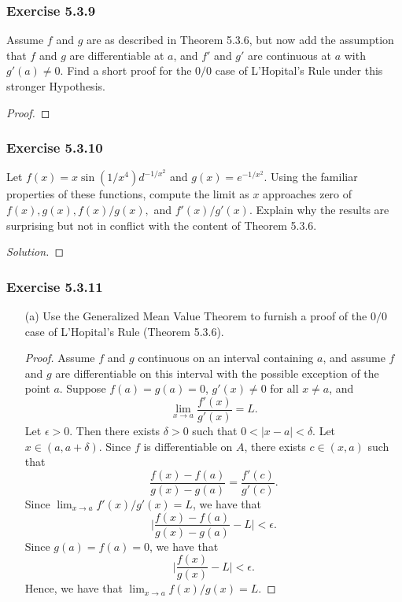 \subsubsection{Exercise 5.3.9} Assume \( f  \) and \( g  \) are as described in Theorem 5.3.6, but now add the assumption that \( f  \) and \( g  \) are differentiable at \( a  \), and \( f' \) and \( g' \) are continuous at \( a  \) with \( g'(a) \neq 0  \). Find a short proof for the \( 0 / 0  \) case of L'Hopital's Rule under this stronger Hypothesis.
\begin{proof}
\end{proof}

\subsubsection{Exercise 5.3.10} Let \( f(x) = x \sin (1/x^4) d^{-1/x^2}  \) and \( g(x) = e^{-1/x^2} \). Using the familiar properties of these functions, compute the limit as \( x  \) approaches zero of \( f(x), g(x), f(x) / g(x),  \) and \( f'(x) / g'(x)  \). Explain why the results are surprising but not in conflict with the content of Theorem 5.3.6.
\begin{proof}[Solution]

\end{proof}

\subsubsection{Exercise 5.3.11} 
\begin{enumerate}
    \item[(a)] Use the Generalized Mean Value Theorem to furnish a proof of the \( 0/0  \) case of L'Hopital's Rule (Theorem 5.3.6).
        \begin{proof}
        Assume \( f  \) and \( g  \) continuous on an interval containing \( a  \), and assume \( f  \) and \( g  \) are differentiable on this interval with the possible exception of the point \( a  \). Suppose \( f(a) = g(a) = 0  \), \( g'(x) \neq 0 \) for all \( x \neq a  \), and 
        \[  \lim_{ x \to a } \frac{ f'(x)  }{ g'(x) } = L. \]
        Let \( \epsilon > 0  \). Then there exists \( \delta > 0  \) such that \( 0 < | x - a  | < \delta  \). Let \( x \in (a, a + \delta ) \). Since \( f  \) is differentiable on \( A  \), there exists \( c \in (x,a)  \) such that  
        \[  \frac{ f(x) - f(a)  }{ g(x) - g(a)  } = \frac{ f'(c)  }{ g'(c) }.  \]
    Since \( \lim_{ x \to a } f'(x) / g'(x) = L  \), we have that
    \[  \Big|  \frac{ f(x) - f(a)  }{ g(x) - g(a)   } - L \Big| < \epsilon.  \]
    Since \( g(a) = f(a) = 0 \), we have that 
    \[ \Big|  \frac{ f(x)  }{ g(x)  } - L \Big|  < \epsilon.  \]
    Hence, we have that \( \lim_{ x \to a } f(x) / g(x) = L  \).
        \end{proof}
\end{enumerate}




